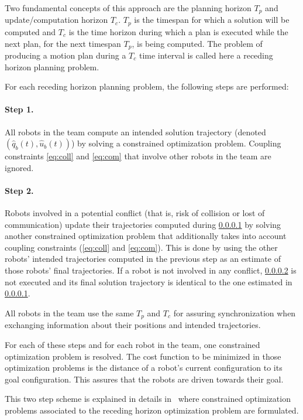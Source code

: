 Two fundamental concepts of this approach are the planning horizon $T_p$ and 
update/computation horizon $T_c$. $T_p$ is the timespan for which a solution 
will be computed and
$T_c$ is the time horizon during which a plan is executed while the
next plan, for the next timespan $T_p$, is being computed.
The problem of producing a motion plan during a $T_c$ time interval is called
here a receding horizon planning problem.

For each receding horizon planning problem, the following steps are performed:
\paragraph{Step 1.}\label{step1} All robots in the team compute an intended solution trajectory (denoted $(\hat{q}_b(t), \hat{u}_b(t))$)
by solving a constrained optimization problem. Coupling
constraints \ref{eq:coll} and \ref{eq:com} that involve 
other robots in the team are ignored.
\paragraph{Step 2.}\label{step2} Robots involved in a potential conflict
(that is, risk of collision or lost of communication) update their trajectories
computed during \ref{step1} by solving another constrained optimization problem
that additionally takes into account
coupling constraints (\ref{eq:coll} and \ref{eq:com}).
This is done by using the other robots' intended
trajectories computed in the previous step as an estimate of those robots'
final trajectories. If a robot is not involved in any conflict, \ref{step2}
is not executed and its final
solution trajectory is identical to the one estimated in \ref{step1}.

\mbox{}

All robots in the team use the same $T_p$ and $T_c$ for assuring synchronization when exchanging information about their positions and intended trajectories.

For each of these steps and for each robot in the team, one constrained optimization problem is resolved. The cost function to be minimized in those
optimization problems
is the distance of a robot's current configuration to its goal configuration.
This assures that the robots are driven towards their goal.

This two step scheme is explained in details in~\cite{Defoort2009, Defoort2007a} where 
constrained optimization problems associated to the receding horizon 
optimization problem are formulated.

